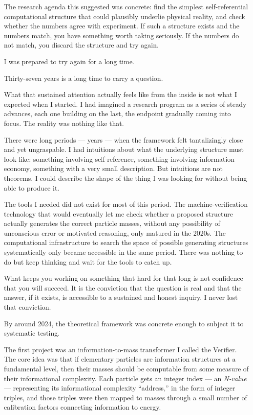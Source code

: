 \documentclass[11pt,openany]{book}
\theoremstyle{remark}
\begin{document}
The research agenda this suggested was concrete: find the simplest self-referential
computational structure that could plausibly underlie physical reality, and check
whether the numbers agree with experiment.
If such a structure exists and the numbers match, you have something worth taking seriously.
If the numbers do not match, you discard the structure and try again.

I was prepared to try again for a long time.

\medskip

Thirty-seven years is a long time to carry a question.

What that sustained attention actually feels like from the inside is not what I expected
when I started.
I had imagined a research program as a series of steady advances, each one building
on the last, the endpoint gradually coming into focus.
The reality was nothing like that.

There were long periods --- years --- when the framework felt tantalizingly close and yet
ungraspable.
I had intuitions about what the underlying structure must look like: something involving
self-reference, something involving information economy, something with a very small
description.
But intuitions are not theorems.
I could describe the shape of the thing I was looking for without being able to produce it.

The tools I needed did not exist for most of this period.
The machine-verification technology that would eventually let me check whether a proposed
structure actually generates the correct particle masses, without any possibility of
unconscious error or motivated reasoning, only matured in the 2020s.
The computational infrastructure to search the space of possible generating structures
systematically only became accessible in the same period.
There was nothing to do but keep thinking and wait for the tools to catch up.

What keeps you working on something that hard for that long is not confidence that you
will succeed.
It is the conviction that the question is real and that the answer, if it exists, is
accessible to a sustained and honest inquiry.
I never lost that conviction.

\medskip

By around 2024, the theoretical framework was concrete enough to subject it to
systematic testing.

The first project was an information-to-mass transformer I called the Verifier.
The core idea was that if elementary particles are information structures at a
fundamental level, then their masses should be computable from some measure of
their informational complexity.
Each particle gets an integer index --- an \emph{N-value} --- representing its
informational complexity ``address,'' in the form of integer triples, and those
triples were then mapped to masses through a small number of calibration factors
connecting information to energy.
\end{document}
